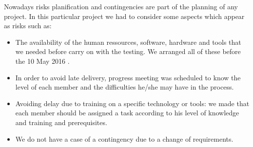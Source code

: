 Nowadays risks planification and contingencies are part of the planning of any project. In this particular project we had to consider some aspects which appear as risks such as: 

\begin{itemize}
 
     \item  The availability of the human ressources, software, hardware and tools that we needed before carry on with the testing. We arranged all of these before the 10 May 2016 . 

      \item In order to avoid late delivery, progress meeting was scheduled to know the level of each member and the difficulties he/she may have in the process.

      \item Avoiding delay due to training on a specific technology or tools: we made that each member should be assigned a task according to his level of knowledge and training and prerequisites.     

       \item We do not have a case of a contingency due to a change of requirements. 

\end{itemize}                        